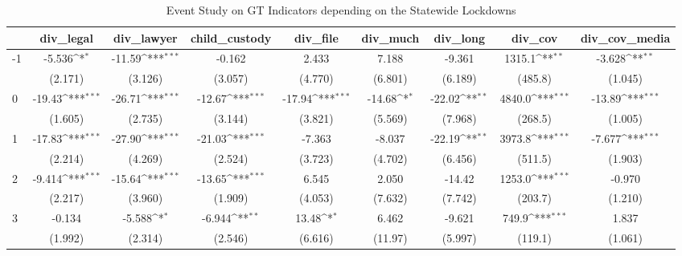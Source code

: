 \documentclass{article}
\begin{document}
{
\def\sym#1{\ifmmode^{#1}\else\(^{#1}\)\fi}
\begin{longtable}{l*{8}{c}}
\caption{Event Study on GT Indicators depending on the Statewide Lockdowns}\\
\hline\hline\endfirsthead\hline\endhead\hline\endfoot\endlastfoot
                &\multicolumn{1}{c}{div\_legal}&\multicolumn{1}{c}{div\_lawyer}&\multicolumn{1}{c}{child\_custody}&\multicolumn{1}{c}{div\_file}&\multicolumn{1}{c}{div\_much}&\multicolumn{1}{c}{div\_long}&\multicolumn{1}{c}{div\_cov}&\multicolumn{1}{c}{div\_cov\_media}\\
\hline
-1              &   -5.536\sym{*}  &   -11.59\sym{***}&   -0.162         &    2.433         &    7.188         &   -9.361         &   1315.1\sym{**} &   -3.628\sym{**} \\
                &  (2.171)         &  (3.126)         &  (3.057)         &  (4.770)         &  (6.801)         &  (6.189)         &  (485.8)         &  (1.045)         \\
0               &   -19.43\sym{***}&   -26.71\sym{***}&   -12.67\sym{***}&   -17.94\sym{***}&   -14.68\sym{*}  &   -22.02\sym{**} &   4840.0\sym{***}&   -13.89\sym{***}\\
                &  (1.605)         &  (2.735)         &  (3.144)         &  (3.821)         &  (5.569)         &  (7.968)         &  (268.5)         &  (1.005)         \\
1               &   -17.83\sym{***}&   -27.90\sym{***}&   -21.03\sym{***}&   -7.363         &   -8.037         &   -22.19\sym{**} &   3973.8\sym{***}&   -7.677\sym{***}\\
                &  (2.214)         &  (4.269)         &  (2.524)         &  (3.723)         &  (4.702)         &  (6.456)         &  (511.5)         &  (1.903)         \\
2               &   -9.414\sym{***}&   -15.64\sym{***}&   -13.65\sym{***}&    6.545         &    2.050         &   -14.42         &   1253.0\sym{***}&   -0.970         \\
                &  (2.217)         &  (3.960)         &  (1.909)         &  (4.053)         &  (7.632)         &  (7.742)         &  (203.7)         &  (1.210)         \\
3               &   -0.134         &   -5.588\sym{*}  &   -6.944\sym{**} &    13.48\sym{*}  &    6.462         &   -9.621         &    749.9\sym{***}&    1.837         \\
                &  (1.992)         &  (2.314)         &  (2.546)         &  (6.616)         &  (11.97)         &  (5.997)         &  (119.1)         &  (1.061)         \\

\end{longtable}}
\end{document}

